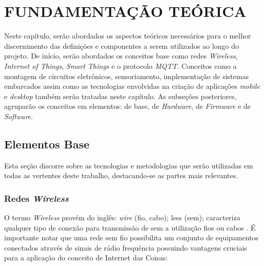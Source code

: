 
\chapter{FUNDAMENTAÇÃO TEÓRICA}
\label{chap:fundamentacao-teorica}

Neste capítulo, serão abordados os aspectos teóricos necessários para o melhor discernimento das definições e componentes a serem utilizados ao longo do projeto. De início, serão abordados os conceitos base como redes \textit{Wireless}, \textit{Internet of Things}, \textit{Smart Things} e o protocolo \textit{MQTT}. Conceitos como a montagem de circuitos eletrônicos, sensoriamento, implementação de sistemas embarcados assim como as tecnologias envolvidas na criação de aplicações \textit{mobile} e \textit{desktop} também serão tratadas neste capítulo. As subseções posteriores, agruparão os conceitos em elementos: de base, de \textit{Hardware},  de \textit{Firmware} e de \textit{Software}.  

\section{Elementos Base}

Esta seção discorre sobre as tecnologias e metodologias que serão utilizadas em todas as vertentes deste trabalho, destacando-se as partes mais relevantes.

\subsection{Redes \textit{Wireless}}

O termo \textit{Wireless} provém do inglês: \textit{wire} (fio, cabo); less (sem); caracteriza qualquer tipo de conexão para transmissão de sem a utilização fios ou cabos \cite{redeswireless}. É importante notar que uma rede sem fio possibilita um conjunto de equipamentos conectados através de sinais de rádio frequência possuindo vantagens cruciais para a aplicação do conceito de Internet das Coisas:

